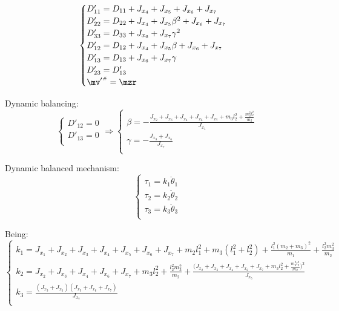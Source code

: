 \documentclass[a4paper,11pt,brazil,fleqn]{article}
\begin{document}
\begin{equation}
\begin{cases}
D'_{11} = D_{11} + J_{x_4} + J_{x_5} + J_{x_6} + J_{x_7} \\
D'_{22} = D_{22} + J_{x_4} + J_{x_5} \beta^2 + J_{x_6} + J_{x_7} \\
D'_{33} = D_{33} + J_{x_6} + J_{x_7} \gamma^2 \\
D'_{12} = D_{12} + J_{x_4} + J_{x_5} \beta + J_{x_6} + J_{x_7} \\
D'_{13} = D_{13} + J_{x_6} + J_{x_7} \gamma  \\
D'_{23} = D'_{13}\\
{\mv'}\ssh = \mzr \\
\end{cases}
\end{equation}

Dynamic balancing:
\begin{equation}
\begin{cases}
D'_{12} = 0 \\
D'_{13} = 0 \\
\end{cases}
\Rightarrow
\begin{cases}
\beta = -\frac{J_{x_2} + J_{x_3} + J_{x_4} + J_{x_6} + J_{x_7} + m_3 l_2^2 + \frac{m_3^2 l_2^2}{m_2}}{J_{x_5}} \\
\gamma = -\frac{J_{x_3} + J_{x_6}}{J_{x_7}} \\
\end{cases}
\end{equation}

Dynamic balanced mechanism:
\begin{equation}
\begin{cases}
\tau_1 = k_1 \ddot{\theta}_1 \\
\tau_2 = k_2 \ddot{\theta}_2 \\
\tau_3 = k_3 \ddot{\theta}_3 \\
\end{cases}
\end{equation}

Being:
\begin{equation}
\begin{cases}
k_1 = J_{x_1} + J_{x_2} + J_{x_3} + J_{x_4} + J_{x_5} + J_{x_6} + J_{x_7} + m_2 l_1^2 + m_3 (l_1^2 + l_2^2) + \frac{l_1^2 (m_2 + m_3)^2}{m_1} + \frac{l_2^2 m_3^2}{m_2} \\
k_2 = J_{x_2} + J_{x_3} + J_{x_4} + J_{x_6} + J_{x_7} + m_3 l_2^2 + \frac{l_2^2 m_3^2}{m_2} + \frac{\big(J_{x_2} + J_{x_3} + J_{x_4} + J_{x_6} + J_{x_7} + m_3 l_2^2 + \frac{m_3^2 l_2^2}{m_2}\big)^2}{J_{x_5}} \\
k_3 = \frac{(J_{x_3}+J_{x_6})(J_{x_3}+J_{x_6}+J_{x_7})}{J_{x_7}} \\
\end{cases}
\end{equation}
\end{document}
